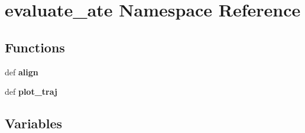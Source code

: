 \section{evaluate\-\_\-ate \-Namespace \-Reference}
\label{namespaceevaluate__ate}
\subsection*{\-Functions}
\begin{DoxyCompactItemize}
\item 
def {\bf align}
\item 
def {\bf plot\-\_\-traj}
\end{DoxyCompactItemize}
\subsection*{\-Variables}
